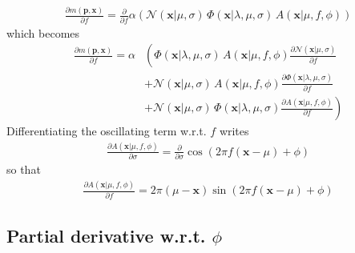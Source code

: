 \documentclass{article}
\begin{document}
\begin{align}
\frac{\partial m\left(\mathbf{p},\mathbf{x}\right)}{\partial f} = \frac{\partial}{\partial f}\alpha\left(\mathcal{N}(\mathbf{x}|\mu,\sigma) \, \Phi(\mathbf{x}|\lambda,\mu,\sigma)  \, A(\mathbf{x}|\mu,f,\phi)\right)
\end{align}
which becomes
\begin{align}
\frac{\partial m\left(\mathbf{p},\mathbf{x}\right)}{\partial f} = \alpha&\left(\Phi(\mathbf{x}|\lambda,\mu,\sigma) \, A(\mathbf{x}|\mu,f,\phi) \frac{\partial \mathcal{N}(\mathbf{x}|\mu,\sigma)}{\partial f} \right. \\ 
&+ \mathcal{N}(\mathbf{x}|\mu,\sigma) \, A(\mathbf{x}|\mu,f,\phi) \frac{\partial \Phi(\mathbf{x}|\lambda,\mu,\sigma)}{\partial f} \\
&+ \left. \mathcal{N}(\mathbf{x}|\mu,\sigma) \, \Phi(\mathbf{x}|\lambda,\mu,\sigma) \frac{\partial A(\mathbf{x}|\mu,f,\phi)}{\partial f} \right)
\end{align}
Differentiating the oscillating term w.r.t. $f$ writes
\begin{align}
\frac{\partial A(\mathbf{x}|\mu,f,\phi)}{\partial \sigma} = \frac{\partial}{\partial\sigma} \cos\left(2 \pi f \left(\mathbf{x} - \mu\right) + \phi\right)
\end{align}
so that
\begin{align}
\frac{\partial A(\mathbf{x}|\mu,f,\phi)}{\partial f} = 2 \pi \left(\mu-\mathbf{x}\right) \sin(2\pi f (\mathbf{x}-\mu)+\phi)
\end{align}
%
\subsection{Partial derivative w.r.t. $\phi$}
\end{document}
